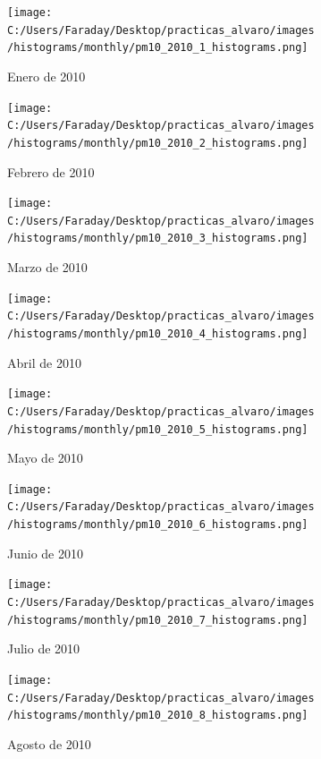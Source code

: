\documentclass[12pt]{article}
\begin{document}
\newpage

\begin{figure}[H]
\centering
\begin{subfigure}[h]{0.45\textwidth}
\texttt{[image: C:/Users/Faraday/Desktop/practicas\_alvaro/images/histograms/monthly/pm10\_2010\_1\_histograms.png]}
\caption{Enero de 2010}
\label{fig:hist-mon-3-1-2010}
\end{subfigure}
%
\begin{subfigure}[H]{0.45\textwidth}
\texttt{[image: C:/Users/Faraday/Desktop/practicas\_alvaro/images/histograms/monthly/pm10\_2010\_2\_histograms.png]}
\caption{Febrero de 2010}
\label{fig:hist-mon-3-2-2010}
\end{subfigure}
\caption{}
\end{figure}

\begin{figure}[H]
\centering
\begin{subfigure}[h]{0.45\textwidth}
\texttt{[image: C:/Users/Faraday/Desktop/practicas\_alvaro/images/histograms/monthly/pm10\_2010\_3\_histograms.png]}
\caption{Marzo de 2010}
\label{fig:hist-mon-3-3-2010}
\end{subfigure}
%
\begin{subfigure}[H]{0.45\textwidth}
\texttt{[image: C:/Users/Faraday/Desktop/practicas\_alvaro/images/histograms/monthly/pm10\_2010\_4\_histograms.png]}
\caption{Abril de 2010}
\label{fig:hist-mon-3-4-2010}
\end{subfigure}
\caption{}
\end{figure}

\begin{figure}[H]
\centering
\begin{subfigure}[h]{0.45\textwidth}
\texttt{[image: C:/Users/Faraday/Desktop/practicas\_alvaro/images/histograms/monthly/pm10\_2010\_5\_histograms.png]}
\caption{Mayo de 2010}
\label{fig:hist-mon-3-5-2010}
\end{subfigure}
%
\begin{subfigure}[H]{0.45\textwidth}
\texttt{[image: C:/Users/Faraday/Desktop/practicas\_alvaro/images/histograms/monthly/pm10\_2010\_6\_histograms.png]}
\caption{Junio de 2010}
\label{fig:hist-mon-3-6-2010}
\end{subfigure}
\caption{}
\end{figure}

\newpage

\begin{figure}[H]
\centering
\begin{subfigure}[h]{0.45\textwidth}
\texttt{[image: C:/Users/Faraday/Desktop/practicas\_alvaro/images/histograms/monthly/pm10\_2010\_7\_histograms.png]}
\caption{Julio de 2010}
\label{fig:hist-mon-3-7-2010}
\end{subfigure}
%
\begin{subfigure}[H]{0.45\textwidth}
\texttt{[image: C:/Users/Faraday/Desktop/practicas\_alvaro/images/histograms/monthly/pm10\_2010\_8\_histograms.png]}
\caption{Agosto de 2010}
\label{fig:hist-mon-3-8-2010}
\end{subfigure}
\caption{}
\end{figure}
\end{document}

